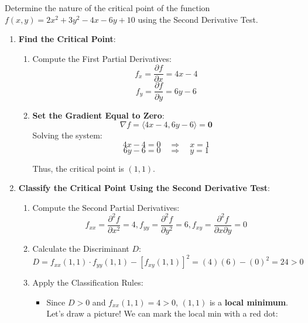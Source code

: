 \exampleline
\begin{example} Determine the nature of the critical point of the function \( f(x,y) = 2x^2 + 3y^2 - 4x - 6y + 10 \) using the Second Derivative Test.
    
    \begin{solution}
        \begin{enumerate}
            \item \textbf{Find the Critical Point}:
            
            \begin{enumerate}
                \item Compute the First Partial Derivatives:
                \[
                f_x = \frac{\partial f}{\partial x} = 4x - 4
                \]
                \[
                f_y = \frac{\partial f}{\partial y} = 6y - 6
                \]
                
                \item \textbf{Set the Gradient Equal to Zero}:
                \[
                \nabla f = \langle 4x - 4, 6y - 6 \rangle = \mathbf{0}
                \]
                Solving the system:
                \[
                4x - 4 = 0 \quad \Rightarrow \quad x = 1
                \]
                \[
                6y - 6 = 0 \quad \Rightarrow \quad y = 1
                \]
                
                Thus, the critical point is \( (1, 1) \).
            \end{enumerate}
            
            \item \textbf{Classify the Critical Point Using the Second Derivative Test}:
            
            \begin{enumerate}
                \item Compute the Second Partial Derivatives:
                \[
                f_{xx} = \frac{\partial^2 f}{\partial x^2} = 4, f_{yy} = \frac{\partial^2 f}{\partial y^2} = 6,  f_{xy} = \frac{\partial^2 f}{\partial x \partial y} = 0
                \]
                
                \item Calculate the Discriminant \( D \):
                \[
                D = f_{xx}(1,1) \cdot f_{yy}(1,1) - [f_{xy}(1,1)]^2 = (4)(6) - (0)^2 = 24 > 0
                \]
                
                \item Apply the Classification Rules:
                \begin{itemize}
                    \item Since \( D > 0 \) and \( f_{xx}(1,1) = 4 > 0 \), \( (1, 1) \) is a \textbf{local minimum}. Let's draw a picture! We can mark the local min with a red dot:
                \end{itemize}
            \end{enumerate}
        \end{enumerate}


\end{solution}
\end{example}
